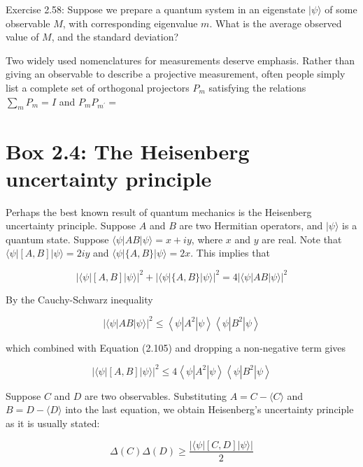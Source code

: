 \documentclass[10pt]{article}
\begin{document}
Exercise 2.58: Suppose we prepare a quantum system in an eigenstate $|\psi\rangle$ of some observable $M$, with corresponding eigenvalue $m$. What is the average observed value of $M$, and the standard deviation?

Two widely used nomenclatures for measurements deserve emphasis. Rather than giving an observable to describe a projective measurement, often people simply list a complete set of orthogonal projectors $P_{m}$ satisfying the relations $\sum_{m} P_{m}=I$ and $P_{m} P_{m^{\prime}}=$

\section*{Box 2.4: The Heisenberg uncertainty principle}
Perhaps the best known result of quantum mechanics is the Heisenberg uncertainty principle. Suppose $A$ and $B$ are two Hermitian operators, and $|\psi\rangle$ is a quantum state. Suppose $\langle\psi|A B| \psi\rangle=x+i y$, where $x$ and $y$ are real. Note that $\langle\psi|[A, B]| \psi\rangle=2 i y$ and $\langle\psi|\{A, B\}| \psi\rangle=2 x$. This implies that


\begin{equation*}
|\langle\psi|[A, B]| \psi\rangle|^{2}+|\langle\psi|\{A, B\}| \psi\rangle|^{2}=4|\langle\psi|A B| \psi\rangle|^{2} \tag{2.105}
\end{equation*}


By the Cauchy-Schwarz inequality


\begin{equation*}
|\langle\psi|A B| \psi\rangle|^{2} \leq\left\langle\psi\left|A^{2}\right| \psi\right\rangle\left\langle\psi\left|B^{2}\right| \psi\right\rangle \tag{2.106}
\end{equation*}


which combined with Equation (2.105) and dropping a non-negative term gives


\begin{equation*}
|\langle\psi|[A, B]| \psi\rangle|^{2} \leq 4\left\langle\psi\left|A^{2}\right| \psi\right\rangle\left\langle\psi\left|B^{2}\right| \psi\right\rangle \tag{2.107}
\end{equation*}


Suppose $C$ and $D$ are two observables. Substituting $A=C-\langle C\rangle$ and $B=D-\langle D\rangle$ into the last equation, we obtain Heisenberg's uncertainty principle as it is usually stated:


\begin{equation*}
\Delta(C) \Delta(D) \geq \frac{|\langle\psi|[C, D]| \psi\rangle|}{2} \tag{2.108}
\end{equation*}
\end{document}
